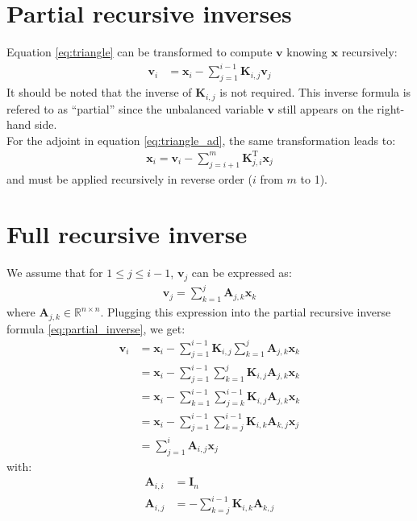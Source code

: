 \documentclass[12pt]{article}
\begin{document}
\section{Partial recursive inverses}
Equation \eqref{eq:triangle} can be transformed to compute $\mathbf{v}$ knowing $\mathbf{x}$ recursively:
\begin{align}
\label{eq:partial_inverse}
\mathbf{v}_i & = \mathbf{x}_i - \sum_{j=1}^{i-1} \mathbf{K}_{i,j} \mathbf{v}_j
\end{align}
It should be noted that the inverse of $\mathbf{K}_{i,j}$ is not required. This inverse formula is refered to as ``partial'' since the unbalanced variable $\mathbf{v}$ still appears on the right-hand side.\\
$  $\\
For the adjoint in equation \eqref{eq:triangle_ad}, the same transformation leads to:
\begin{align}
\label{eq:partial_inverse_ad}
\mathbf{x}_i = \mathbf{v}_i - \sum_{j=i+1}^{m} \mathbf{K}^\mathrm{T}_{j,i} \mathbf{x}_j
\end{align}
and must be applied recursively in reverse order ($i$ from $m$ to 1).

\section{Full recursive inverse}
We assume that for $1 \le j \le i-1$, $\mathbf{v}_j$ can be expressed as:
\begin{align}
\mathbf{v}_j = \sum_{k=1}^j \mathbf{A}_{j,k} \mathbf{x}_k
\end{align}
where $\mathbf{A}_{j,k} \in \mathbb{R}^{n \times n}$. Plugging this expression into the partial recursive inverse formula \eqref{eq:partial_inverse}, we get:
\begin{align}
\label{eq:full_inverse}
\mathbf{v}_i & = \mathbf{x}_i - \sum_{j=1}^{i-1} \mathbf{K}_{i,j} \sum_{k=1}^j \mathbf{A}_{j,k} \mathbf{x}_k \nonumber \\
& = \mathbf{x}_i - \sum_{j=1}^{i-1} \sum_{k=1}^j \mathbf{K}_{i,j} \mathbf{A}_{j,k} \mathbf{x}_k \nonumber \\
& = \mathbf{x}_i - \sum_{k=1}^{i-1} \sum_{j=k}^{i-1} \mathbf{K}_{i,j} \mathbf{A}_{j,k} \mathbf{x}_k \nonumber \\
& = \mathbf{x}_i - \sum_{j=1}^{i-1} \sum_{k=j}^{i-1} \mathbf{K}_{i,k} \mathbf{A}_{k,j} \mathbf{x}_j \nonumber \\
& = \sum_{j=1}^i \mathbf{A}_{i,j} \mathbf{x}_j
\end{align}
with:
\begin{align}
\mathbf{A}_{i,i} & = \mathbf{I}_n \\
\mathbf{A}_{i,j} & = - \sum_{k=j}^{i-1} \mathbf{K}_{i,k} \mathbf{A}_{k,j}
\end{align}
\end{document}
